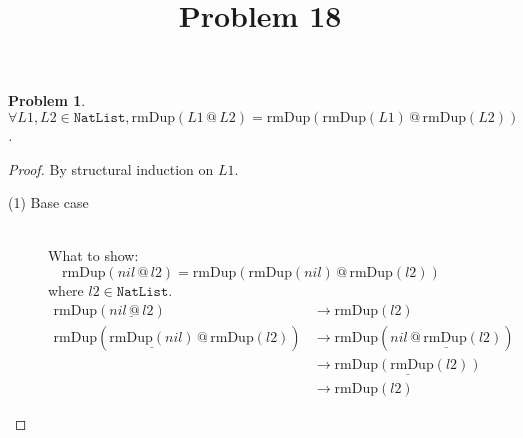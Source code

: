 \documentclass[12pt, a4paper]{article}
\title{Problem 18}
\date{\vspace{-5ex}}
\newtheorem{problem}{Problem}
\newcommand{\rel}[1]{\mathrel{#1}}
\newcommand{\rmx}[1]{\mathrm{#1}}
\newcommand{\larrow}{\longrightarrow}
\newcommand{\under}{\underline}
\begin{document}
\maketitle

\begin{problem}
$\forall L1, L2 \in \mathtt{NatList}, \rmx{rmDup}(L1 \rel{@} L2) = \rmx{rmDup}(\rmx{rmDup}(L1) \rel{@} \rmx{rmDup}(L2))$.
\end{problem}
\begin{proof}
By structural induction on $L1$.
\begin{description}
\item[(1) Base case]~\\
\noindent
What to show: $\quad \rmx{rmDup}(nil \rel{@} l2) = \rmx{rmDup}(\rmx{rmDup}(nil) \rel{@} \rmx{rmDup}(l2))$\\
where $l2 \in \mathtt{NatList}$.
\begin{align*}
\rmx{rmDup}(\under{nil \rel{@} l2})
	&\larrow \rmx{rmDup}(l2) \tag{by @1} \\
\rmx{rmDup}(\under{\rmx{rmDup}(nil)} \rel{@} \rmx{rmDup}(l2))
	&\larrow \rmx{rmDup}(\under{nil \rel{@} \rmx{rmDup}(l2)}) \tag{by rmDup1} \\
	&\larrow \under{\rmx{rmDup}(\rmx{rmDup}(l2))} \tag{by @1} \\
	&\larrow \rmx{rmDup}(l2) \tag{by Problem 17}
\end{align*}


\end{description}
\end{proof}
\end{document}
